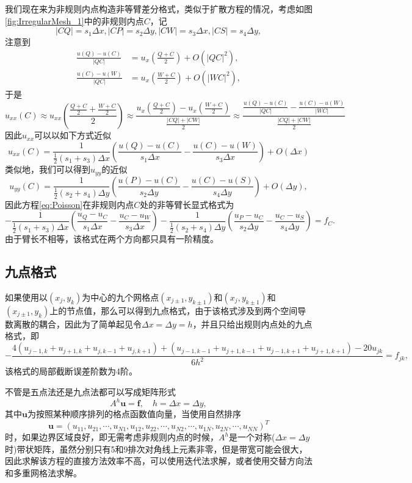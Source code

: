 \documentclass[a4paper,10pt]{ctexart}
\begin{document}
我们现在来为非规则内点构造非等臂差分格式，类似于扩散方程的情况，考虑如图\ref{fig:IrregularMesh_1}中的非规则内点$ C $，记
\[
    |CQ| = s_1 \Delta x, |CP| = s_2 \Delta y, |CW| = s_3 \Delta x, |CS| = s_4 \Delta y,
\]
注意到
\[
    \begin{aligned}
        \frac{u(Q) - u(C)}{|QC|} &= u_x(\frac{Q+C}{2}) + O(|QC|^2),\\
        \frac{u(C) - u(W)}{|QC|} &= u_x(\frac{W+C}{2}) + O(|WC|^2),
    \end{aligned}
\]
于是
\[
    u_{xx}(C) \approx u_{xx}(\frac{\frac{Q+C}{2}+\frac{W+C}{2}}{2})\approx \frac{u_x(\frac{Q+C}{2})-u_x(\frac{W+C}{2})}{\frac{|CQ|+|CW|}{2}} \approx \frac{\frac{u(Q) - u(C)}{|QC|} - \frac{u(C) - u(W)}{|WC|}}{\frac{|CQ|+|CW|}{2}}
\]
因此$ u_{xx} $可以以如下方式近似
\begin{equation}
    u_{xx}(C) = \frac{1}{\frac{1}{2}(s_1+s_3)\Delta x}\left( \frac{u(Q) - u(C)}{s_1 \Delta x} - \frac{u(C)-u(W)}{s_3\Delta x} \right) + O(\Delta x)
\end{equation}
类似地，我们可以得到$ u_{yy} $的近似
\begin{equation}
    u_{yy}(C) = \frac{1}{\frac{1}{2}(s_2+s_4)\Delta y}\left( \frac{u(P) - u(C)}{s_2 \Delta y} - \frac{u(C)-u(S)}{s_4\Delta y} \right) + O(\Delta y),
\end{equation}
因此方程\eqref{eq:Poisson}在非规则内点$ C $处的非等臂长显式格式为
\begin{equation}
    -\frac{1}{\frac{1}{2}(s_1+s_3)\Delta x}\left( \frac{u_Q - u_C}{s_1 \Delta x} - \frac{u_C - u_W}{s_3\Delta x} \right) - \frac{1}{\frac{1}{2}(s_2+s_4)\Delta y}\left( \frac{u_P - u_C}{s_2 \Delta y} - \frac{u_C - u_S}{s_4\Delta y} \right) = f_C.
\end{equation}
由于臂长不相等，该格式在两个方向都只具有一阶精度。

\subsection{九点格式}
如果使用以$ (x_j,y_k) $为中心的九个网格点$ (x_{j\pm 1},y_{k\pm 1}) $和$ (x_j,y_{k\pm 1}) $和$ (x_{j\pm 1},y_k) $上的节点值，那么可以得到九点格式，由于该格式涉及到两个空间导数离散的耦合，因此为了简单起见令$ \Delta x = \Delta y = h $，并且只给出规则内点处的九点格式，即
\[
    -\frac{4(u_{j-1,k}+u_{j+1,k}+u_{j,k-1}+u_{j,k+1}) + (u_{j-1,k-1}+u_{j+1,k-1}+u_{j-1,k+1}+u_{j+1,k+1}) - 20u_{jk}}{6h^2} = f_{jk},
\]
该格式的局部截断误差阶数为4阶。

不管是五点法还是九点法都可以写成矩阵形式
\[
    A^h\bm{u} = \bm{f},  \quad h = \Delta x = \Delta y,
\]
其中$ \bm{u} $为按照某种顺序排列的格点函数值向量，当使用自然排序
\[
    \bm{u} = (u_{11},u_{21},\cdots,u_{N1},u_{12},u_{22},\cdots,u_{N2},\cdots,u_{1N},u_{2N},\cdots,u_{NN})^T
\]
时，如果边界区域良好，即无需考虑非规则内点的时候，$ A^h $是一个对称($ \Delta x=\Delta y $时)带状矩阵，虽然分别只有5和9排次对角线上元素非零，但是带宽可能会很大，因此求解该方程的直接方法效率不高，可以使用迭代法求解，或者使用交替方向法和多重网格法求解。
\end{document}
